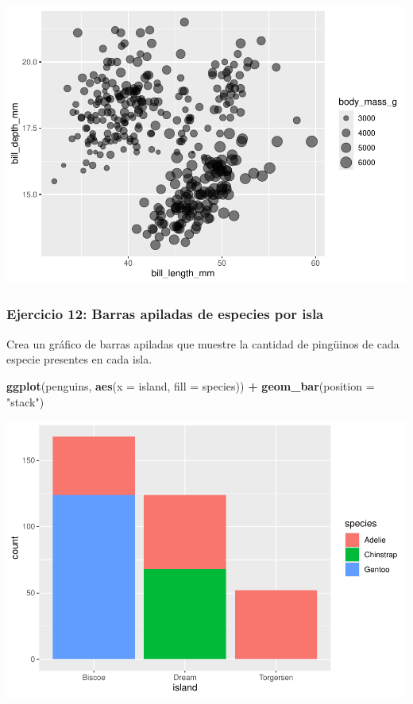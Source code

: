 \documentclass[
]{book}
\newenvironment{Shaded}{\begin{snugshade}}{\end{snugshade}}
\newcommand{\AttributeTok}[1]{\textcolor[rgb]{0.13,0.29,0.53}{#1}}
\newcommand{\FunctionTok}[1]{\textcolor[rgb]{0.13,0.29,0.53}{\textbf{#1}}}
\newcommand{\NormalTok}[1]{#1}
\newcommand{\SpecialCharTok}[1]{\textcolor[rgb]{0.81,0.36,0.00}{\textbf{#1}}}
\newcommand{\StringTok}[1]{\textcolor[rgb]{0.31,0.60,0.02}{#1}}
\begin{document}
\includegraphics{bookdown-demo_files/figure-latex/unnamed-chunk-191-1.pdf}

\subsubsection{Ejercicio 12: Barras apiladas de especies por isla}\label{ejercicio-12-barras-apiladas-de-especies-por-isla}

Crea un gráfico de barras apiladas que muestre la cantidad de pingüinos de cada especie presentes en cada isla.

\begin{Shaded}
\begin{Highlighting}[]
\FunctionTok{ggplot}\NormalTok{(penguins, }\FunctionTok{aes}\NormalTok{(}\AttributeTok{x =}\NormalTok{ island, }\AttributeTok{fill =}\NormalTok{ species)) }\SpecialCharTok{+}
  \FunctionTok{geom\_bar}\NormalTok{(}\AttributeTok{position =} \StringTok{"stack"}\NormalTok{)}
\end{Highlighting}
\end{Shaded}

\includegraphics{bookdown-demo_files/figure-latex/unnamed-chunk-192-1.pdf}
\end{document}
